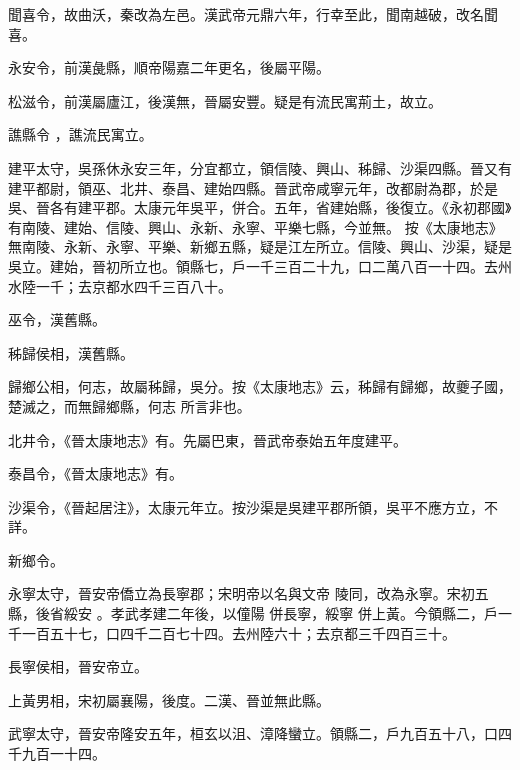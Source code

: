 \begin{pinyinscope}
 聞喜令，故曲沃，秦改為左邑。漢武帝元鼎六年，行幸至此，聞南越破，改名聞喜。



 永安令，前漢彘縣，順帝陽嘉二年更名，後屬平陽。



 松滋令，前漢屬廬江，後漢無，晉屬安豐。疑是有流民寓荊土，故立。


譙縣令
 ，譙流民寓立。



 建平太守，吳孫休永安三年，分宜都立，領信陵、興山、秭歸、沙渠四縣。晉又有建平都尉，領巫、北井、泰昌、建始四縣。晉武帝咸寧元年，改都尉為郡，於是吳、晉各有建平郡。太康元年吳平，併合。五年，省建始縣，後復立。《永初郡國》有南陵、建始、信陵、興山、永新、永寧、平樂七縣，今並無。
 按《太康地志》無南陵、永新、永寧、平樂、新鄉五縣，疑是江左所立。信陵、興山、沙渠，疑是吳立。建始，晉初所立也。領縣七，戶一千三百二十九，口二萬八百一十四。去州水陸一千；去京都水四千三百八十。



 巫令，漢舊縣。



 秭歸侯相，漢舊縣。



 歸鄉公相，何志，故屬秭歸，吳分。按《太康地志》云，秭歸有歸鄉，故夔子國，楚滅之，而無歸鄉縣，何志
 所言非也。



 北井令，《晉太康地志》有。先屬巴東，晉武帝泰始五年度建平。



 泰昌令，《晉太康地志》有。



 沙渠令，《晉起居注》，太康元年立。按沙渠是吳建平郡所領，吳平不應方立，不詳。



 新鄉令。


永寧太守，晉安帝僑立為長寧郡；宋明帝以名與文帝
 陵同，改為永寧。宋初五縣，後省綏安
 。孝武孝建二年後，以僮陽
 併長寧，綏寧
 併上黃。今領縣二，戶一千一百五十七，口四千二百七十四。去州陸六十；去京都三千四百三十。



 長寧侯相，晉安帝立。



 上黃男相，宋初屬襄陽，後度。二漢、晉並無此縣。



 武寧太守，晉安帝隆安五年，桓玄以沮、漳降蠻立。領縣二，戶九百五十八，口四千九百一十四。




\end{pinyinscope}
